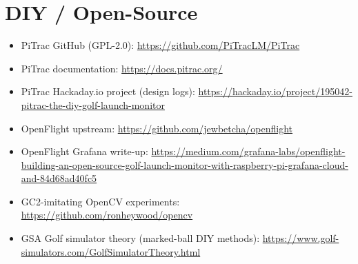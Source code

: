 \section{DIY / Open-Source}
\begin{itemize}\small
\item PiTrac GitHub (GPL-2.0): \url{https://github.com/PiTracLM/PiTrac}
\item PiTrac documentation: \url{https://docs.pitrac.org/}
\item PiTrac Hackaday.io project (design logs):
  \url{https://hackaday.io/project/195042-pitrac-the-diy-golf-launch-monitor}
\item OpenFlight upstream: \url{https://github.com/jewbetcha/openflight}
\item OpenFlight Grafana write-up:
  \url{https://medium.com/grafana-labs/openflight-building-an-open-source-golf-launch-monitor-with-raspberry-pi-grafana-cloud-and-84d68ad40fc5}
\item GC2-imitating OpenCV experiments:
  \url{https://github.com/ronheywood/opencv}
\item GSA Golf simulator theory (marked-ball DIY methods):
  \url{https://www.golf-simulators.com/GolfSimulatorTheory.html}
\end{itemize}

